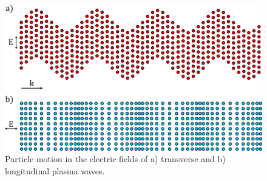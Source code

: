 \begin{figure}[t!]
    \includegraphics[width=0.75\linewidth]{Theory/Images/plasma_waves.png}
    \centering
    \caption{Particle motion in the electric fields of a) transverse and b) longitudinal plasma waves.}%
    \label{fig:theory_plasma_waves}
\end{figure}


